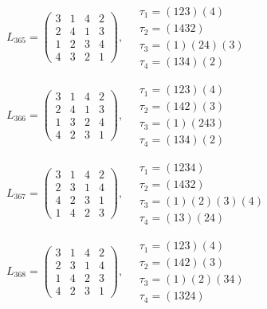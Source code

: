 $L_{365} = \begin{pmatrix} 3 & 1 & 4 & 2 \\ 2 & 4 & 1 & 3 \\ 1 & 2 & 3 & 4 \\ 4 & 3 & 2 & 1 \end{pmatrix}, \quad \begin{matrix} \tau_{1} = (1 2 3)(4) \\ \tau_{2} = (1 4 3 2) \\ \tau_{3} = (1)(2 4)(3) \\ \tau_{4} = (1 3 4)(2) \end{matrix}$

$L_{366} = \begin{pmatrix} 3 & 1 & 4 & 2 \\ 2 & 4 & 1 & 3 \\ 1 & 3 & 2 & 4 \\ 4 & 2 & 3 & 1 \end{pmatrix}, \quad \begin{matrix} \tau_{1} = (1 2 3)(4) \\ \tau_{2} = (1 4 2)(3) \\ \tau_{3} = (1)(2 4 3) \\ \tau_{4} = (1 3 4)(2) \end{matrix}$

$L_{367} = \begin{pmatrix} 3 & 1 & 4 & 2 \\ 2 & 3 & 1 & 4 \\ 4 & 2 & 3 & 1 \\ 1 & 4 & 2 & 3 \end{pmatrix}, \quad \begin{matrix} \tau_{1} = (1 2 3 4) \\ \tau_{2} = (1 4 3 2) \\ \tau_{3} = (1)(2)(3)(4) \\ \tau_{4} = (1 3)(2 4) \end{matrix}$

$L_{368} = \begin{pmatrix} 3 & 1 & 4 & 2 \\ 2 & 3 & 1 & 4 \\ 1 & 4 & 2 & 3 \\ 4 & 2 & 3 & 1 \end{pmatrix}, \quad \begin{matrix} \tau_{1} = (1 2 3)(4) \\ \tau_{2} = (1 4 2)(3) \\ \tau_{3} = (1)(2)(3 4) \\ \tau_{4} = (1 3 2 4) \end{matrix}$

